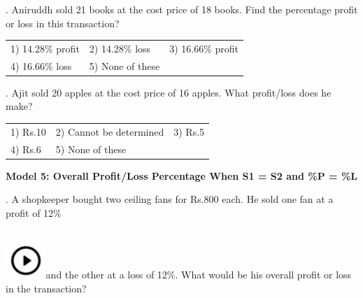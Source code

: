 \documentclass{article}
\begin{document}
	\noindent 
	
	\noindent 
	
	\noindent 
	
	\noindent 
	
	\noindent 
	
	. Aniruddh sold 21 books at the cost price of 18 books. Find the percentage profit or loss in this transaction?
	
	\noindent 
	


		 
	\begin{tabular}{p{1.7in} p{1.6in} p{1.6in}} \\ 
 1) 14.28\% profit   & 2) 14.28\% loss\  & 3) 16.66\% profit  \\
4) 16.66\% loss
		 & 5) None of these  \\

	\end{tabular}
	
	
	
	\noindent 
	
	\noindent 
	
	. Ajit sold 20 apples at the cost price of 16 apples. What profit/loss does he make?
	
	\noindent 
	
	\noindent  
	\begin{tabular}{p{1.7in} p{1.6in} p{1.6in}} \\ 
 1) Rs.10                                                          & 2) Cannot be determined        & 3) Rs.5
	
	\noindent 
	
	\noindent \\
4) Rs.6                                                            & 5) None of these  \\
\end{tabular}
	
	\noindent 
	
	\noindent 
	
	\noindent \textbf{Model 5: Overall Profit/Loss Percentage When S1 = S2 and \%P = \%L}
	
	\noindent 
	
	.  A shopkeeper bought two ceiling fans for Rs.800 each. He sold one fan at a profit of 12\%
	
	\noindent \noindent \\ \includegraphics*[width=0.60in, height=0.52in]{images/image1}and the other at a loss of 12\%. What would be his overall profit or loss in the transaction?
	
\end{document}
